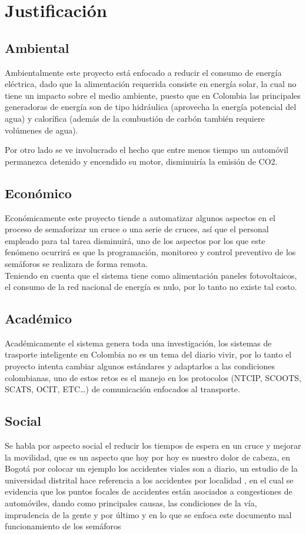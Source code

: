 \chapter{Justificación}

\section{Ambiental}
Ambientalmente este proyecto está enfocado a reducir el consumo de energía eléctrica, 
dado que la  alimentación requerida consiste en  energía solar, la cual no tiene un 
impacto sobre el medio ambiente, puesto que en Colombia las principales generadoras 
de energía son de tipo hidráulica (aprovecha la energía potencial del agua) y calorífica 
(además de la combustión de carbón también requiere volúmenes de agua). 

Por otro lado se ve involucrado el hecho que entre menos tiempo un automóvil permanezca 
detenido y encendido su motor, disminuiría la emisión de CO2.
\section{Económico}
Económicamente este proyecto tiende a automatizar algunos aspectos en el proceso de 
semaforizar un cruce o una serie de cruces, así que el personal empleado para tal 
tarea disminuirá, uno de los aspectos por los que este fenómeno ocurrirá es que la programación, 
monitoreo y control preventivo de los semáforos se realizara de forma remota.\\

Teniendo en cuenta que el sistema tiene como alimentación paneles fotovoltaicos, 
el consumo de la red nacional de energía es nulo, por lo tanto no existe tal costo.
\section{Académico}
Académicamente el sistema genera toda una investigación, los sistemas de trasporte inteligente 
en Colombia no es un tema del diario vivir, por lo tanto el proyecto intenta cambiar algunos estándares 
y adaptarlos a las condiciones colombianas, uno de estos retos es el manejo en los protocolos (NTCIP, SCOOTS, SCATS, OCIT, ETC…) 
de comunicación enfocados al transporte.

\section{Social}
Se habla por aspecto social el reducir los tiempos de espera en un cruce y mejorar la movilidad, 
que es un aspecto que hoy por hoy es nuestro dolor de cabeza, en Bogotá por colocar un ejemplo 
los accidentes viales son a diario, un estudio de la universidad distrital hace referencia a los 
accidentes por localidad \cite{4}, en el cual se evidencia que los puntos focales de accidentes 
están asociados a congestiones de automóviles, dando como principales causas, las condiciones de la vía, 
imprudencia de la gente y por último y en lo que se enfoca este documento mal funcionamiento de los semáforos\cite{5}


